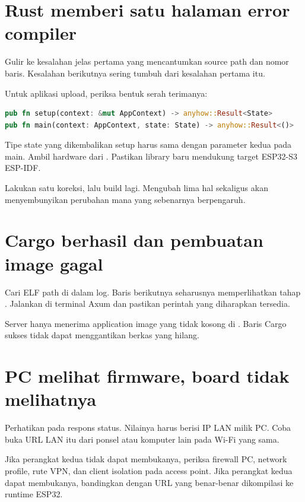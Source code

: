 \section{Rust memberi satu halaman error compiler}

Gulir ke kesalahan jelas pertama yang mencantumkan source path dan nomor baris. Kesalahan berikutnya sering tumbuh dari kesalahan pertama itu.

Untuk aplikasi upload, periksa bentuk serah terimanya:

\begin{lstlisting}[language=Rust,numbers=none]
pub fn setup(context: &mut AppContext) -> anyhow::Result<State>
pub fn main(context: AppContext, state: State) -> anyhow::Result<()>
\end{lstlisting}

Tipe state yang dikembalikan setup harus sama dengan parameter kedua pada main. Ambil hardware dari . Pastikan library baru mendukung target ESP32-S3 ESP-IDF.

Lakukan satu koreksi, lalu build lagi. Mengubah lima hal sekaligus akan menyembunyikan perubahan mana yang sebenarnya berpengaruh.

\section{Cargo berhasil dan pembuatan image gagal}

Cari ELF path di dalam log. Baris berikutnya seharusnya memperlihatkan tahap . Jalankan  di terminal Axum dan pastikan perintah yang diharapkan tersedia.

Server hanya menerima application image yang tidak kosong di . Baris Cargo sukses tidak dapat menggantikan berkas  yang hilang.

\section{PC melihat firmware, board tidak melihatnya}

Perhatikan  pada respons status. Nilainya harus berisi IP LAN milik PC. Coba buka URL LAN itu dari ponsel atau komputer lain pada Wi-Fi yang sama.

Jika perangkat kedua tidak dapat membukanya, periksa firewall PC, network profile, rute VPN, dan client isolation pada access point. Jika perangkat kedua dapat membukanya, bandingkan dengan URL yang benar-benar dikompilasi ke runtime ESP32.

